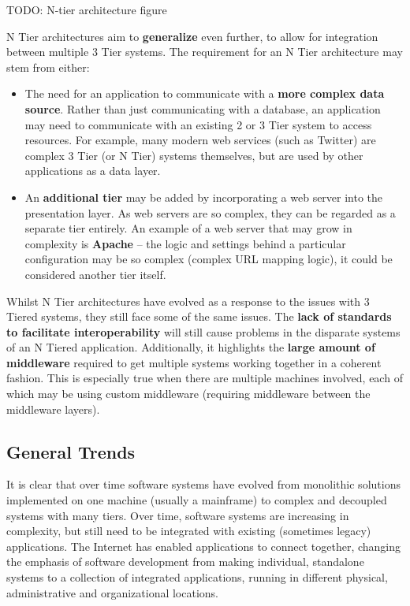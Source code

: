 \documentclass{article}
\begin{document}
TODO: N-tier architecture figure

N Tier architectures aim to \textbf{generalize} even further, to allow for integration between multiple 3 Tier systems. The requirement for an N Tier architecture may stem from either:
\begin{itemize}
    \item The need for an application to communicate with a 	\textbf{more complex data source}. Rather than just communicating with a database, an application may need to communicate with an existing 2 or 3 Tier system to access resources. For example, many modern web services (such as Twitter) are complex 3 Tier (or N Tier) systems themselves, but are used by other applications as a data layer.

    \item An \textbf{additional tier} may be added by incorporating a web server into the presentation layer. As web servers are so complex, they can be regarded as a separate tier entirely. An example of a web server that may grow in complexity is \textbf{Apache} -- the logic and settings behind a particular configuration may be so complex (complex URL mapping logic), it could be considered another tier itself.
\end{itemize}

Whilst N Tier architectures have evolved as a response to the issues with 3 Tiered systems, they still face some of the same issues. The \textbf{lack of standards to facilitate interoperability} will still cause problems in the disparate systems of an N Tiered application. Additionally, it highlights the \textbf{large amount of middleware} required to get multiple systems working together in a coherent fashion. This is especially true when there are multiple machines involved, each of which may be using custom middleware (requiring middleware between the middleware layers).

\subsection{General Trends}

It is clear that over time software systems have evolved from monolithic solutions implemented on one machine (usually a mainframe) to complex and decoupled systems with many tiers. Over time, software systems are increasing in complexity, but still need to be integrated with existing (sometimes legacy) applications. The Internet has enabled applications to connect together, changing the emphasis of software development from making individual, standalone systems to a collection of integrated applications, running in different physical, administrative and organizational locations. 
\end{document}
